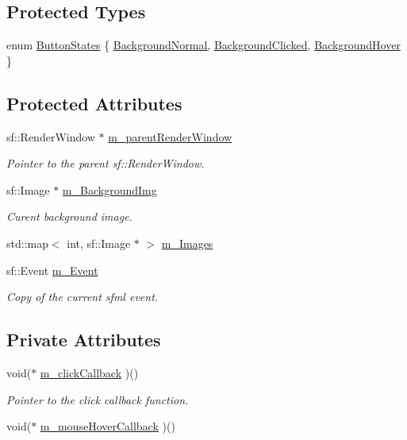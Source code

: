 \subsection*{Protected Types}
\begin{CompactItemize}
\item 
enum \hyperlink{classsfgui_1_1Object_8a7d7ae20a88b7ef8a104f7e6c8596ce}{ButtonStates} \{ \hyperlink{classsfgui_1_1Object_8a7d7ae20a88b7ef8a104f7e6c8596cee8211d79a1f35d08db2b31a914bddc38}{BackgroundNormal}, 
\hyperlink{classsfgui_1_1Object_8a7d7ae20a88b7ef8a104f7e6c8596ce03b529b6f0fee7ab7cc0033441180b67}{BackgroundClicked}, 
\hyperlink{classsfgui_1_1Object_8a7d7ae20a88b7ef8a104f7e6c8596ce9befc9dbae9107e3e7546af33a139df9}{BackgroundHover}
 \}
\end{CompactItemize}
\subsection*{Protected Attributes}
\begin{CompactItemize}
\item 
sf::RenderWindow $\ast$ \hyperlink{classsfgui_1_1Object_518ad23f1c9aab6fd9b346d708c503a8}{m\_\-parentRenderWindow}
\begin{CompactList}\small\item\em Pointer to the parent sf::RenderWindow. \item\end{CompactList}\item 
sf::Image $\ast$ \hyperlink{classsfgui_1_1Object_08225eee55352c02435d14e1bce24dbe}{m\_\-BackgroundImg}
\begin{CompactList}\small\item\em Curent background image. \item\end{CompactList}\item 
std::map$<$ int, sf::Image $\ast$ $>$ \hyperlink{classsfgui_1_1Object_6d7907f767742dcfd37c1b0c349daa2d}{m\_\-Images}
\item 
sf::Event \hyperlink{classsfgui_1_1Object_bd45c91f926c930806870ce8acbb955e}{m\_\-Event}
\begin{CompactList}\small\item\em Copy of the current sfml event. \item\end{CompactList}\end{CompactItemize}
\subsection*{Private Attributes}
\begin{CompactItemize}
\item 
void($\ast$ \hyperlink{classsfgui_1_1Object_5917de9750aa3c8d282899ee83f835b4}{m\_\-clickCallback} )()
\begin{CompactList}\small\item\em Pointer to the click callback function. \item\end{CompactList}\item 
void($\ast$ \hyperlink{classsfgui_1_1Object_ddff61a2d47a7b25e05aa5b6311417ea}{m\_\-mouseHoverCallback} )()
\end{CompactItemize}


